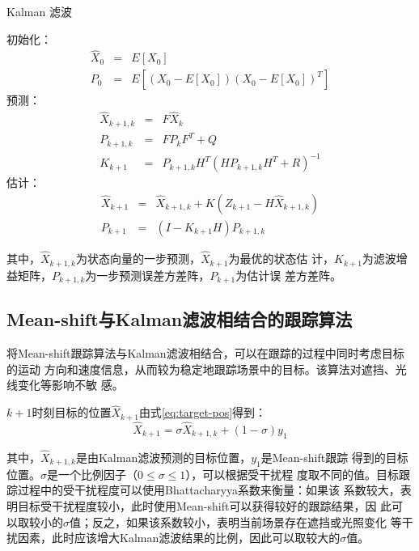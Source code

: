 \begin{algorithm}[htbp]
  \caption{Kalman 滤波}
  \label{alg:kalman}
  \begin{algorithmic}[1]
    \STATE 初始化：
    \begin{eqnarray*}
      \hat{X}_0&=&E[X_0]\\
      P_0&=&E[(X_0-E[X_0])(X_0-E[X_0])^{T}]
    \end{eqnarray*}
    \STATE 预测：
    \begin{eqnarray*}
      \hat{X}_{k+1,k}&=&F \hat{X}_{k}\\ 
      P_{k+1,k}&=&F P_{k}F^{T}+Q\\
      K_{k+1}&=&P_{k+1,k}H^{T}(H P_{k+1,k}H^{T}+R)^{-1}
    \end{eqnarray*}
    \STATE 估计：
    \begin{eqnarray*}
      \hat{X}_{k+1}&=&\hat{X}_{k+1,k}+K(Z_{k+1}-H\hat{X}_{k+1,k})\\
      P_{k+1}&=&(I-K_{k+1}H)P_{k+1,k}
    \end{eqnarray*}
  \end{algorithmic}
\end{algorithm}

其中，$\hat{X}_{k+1, k}$为状态向量的一步预测，$\hat{X}_{k+1}$为最优的状态估
计，$K_{k+1}$为滤波增益矩阵，$P_{k+1, k}$为一步预测误差方差阵，$P_{k+1}$为估计误
差方差阵。

\subsection{Mean-shift与Kalman滤波相结合的跟踪算法}
\label{sec:combine}

将Mean-shift跟踪算法与Kalman滤波相结合，可以在跟踪的过程中同时考虑目标的运动
方向和速度信息，从而较为稳定地跟踪场景中的目标。该算法对遮挡、光线变化等影响不敏
感。

$k+1$时刻目标的位置$\hat{X}_{k+1}$由式\ref{eq:target-pos}得到：
\begin{equation}
  \label{eq:target-pos}
  \hat{X}_{k+1}=\sigma \hat{X}_{k+1,k}+(1-\sigma)y_1
\end{equation}

其中，$\hat{X}_{k+1,k}$是由Kalman滤波预测的目标位置，$y_1$是Mean-shift跟踪
得到的目标位置。$\sigma$是一个比例因子（$0 \le \sigma \le 1$），可以根据受干扰程
度取不同的值。目标跟踪过程中的受干扰程度可以使用Bhattacharyya系数来衡量：如果该
系数较大，表明目标受干扰程度较小，此时使用Mean-shift可以获得较好的跟踪结果，因
此可以取较小的$\sigma$值；反之，如果该系数较小，表明当前场景存在遮挡或光照变化
等干扰因素，此时应该增大Kalman滤波结果的比例，因此可以取较大的$\sigma$值。

